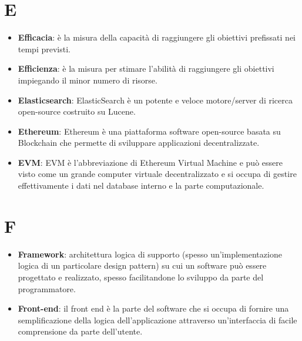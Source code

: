 \documentclass[a4paper, oneside, openany, dvipsnames, table]{article}
\begin{document}
\section{E}
\begin{itemize}
\item \textbf{Efficacia}: è la misura della capacità di raggiungere gli obiettivi prefissati nei tempi previsti.
\item \textbf{Efficienza}: è la misura per stimare l'abilità di raggiungere gli obiettivi impiegando il minor numero di risorse.
\item \textbf{Elasticsearch}: ElasticSearch è un potente e veloce motore/server di ricerca open-source costruito su Lucene.
\item \textbf{Ethereum}: Ethereum è una piattaforma software open-source basata su Blockchain che permette di sviluppare applicazioni decentralizzate.
\item \textbf{EVM}: EVM è l'abbreviazione di Ethereum Virtual Machine e può essere visto come un grande computer virtuale decentralizzato e si occupa di gestire effettivamente i dati nel database interno e la parte computazionale.
\end{itemize}

\section{F}
\begin{itemize}
\item \textbf{Framework}: architettura logica di supporto (spesso un’implementazione logica di un particolare design pattern) su cui un software può essere progettato e realizzato, spesso facilitandone
lo sviluppo da parte del programmatore.
\item \textbf{Front-end}: il front end è la parte del software che si occupa di fornire una semplificazione della logica dell'applicazione attraverso un'interfaccia di facile comprensione da parte dell'utente.
\end{itemize}
\end{document}
